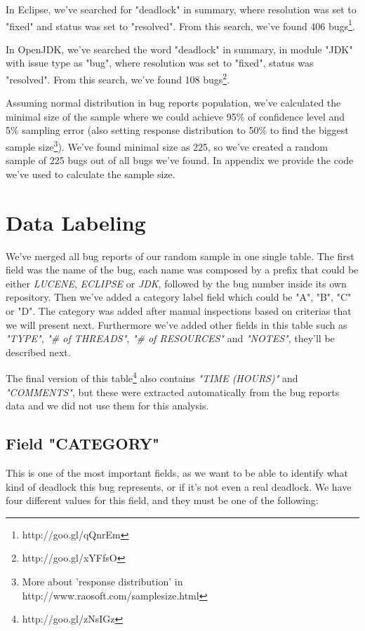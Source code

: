 In Eclipse, we've searched for "deadlock" in summary, where resolution was set to "fixed" and status was set to "resolved". From this search, we've found 406 bugs\footnote{http://goo.gl/qQnrEm}.

In OpenJDK, we've searched the word "deadlock" in summary, in module "JDK" with issue type as "bug", where resolution was set to "fixed", status was "resolved". From this search, we've found 108 bugs\footnote{http://goo.gl/xYFfsO}.

Assuming normal distribution in bug reports population, we've calculated the minimal size of the sample where we could achieve 95\% of confidence level and 5\% sampling error (also setting response distribution to 50\% to find the biggest sample size\footnote{More about 'response distribution' in http://www.raosoft.com/samplesize.html}). We've found minimal size as 225, so we've created a random sample of 225 bugs out of all bugs we've found. In appendix we provide the code we've used to calculate the sample size.

\section{Data Labeling}

We've merged all bug reports of our random sample in one single table. The first field was the name of the bug, each name was composed by a prefix that could be either \emph{LUCENE}, \emph{ECLIPSE} or \emph{JDK}, followed by the bug number inside its own repository. Then we've added a category label field which could be "A", "B", "C" or "D". The category was added after manual inspections based on criterias that we will present next. Furthermore we've added other fields in this table such as \emph{"TYPE"}, \emph{"# of THREADS"}, \emph{"# of RESOURCES"} and \emph{"NOTES"}, they'll be described next.

The final version of this table\footnote{http://goo.gl/zNsIGz} also contains \emph{"TIME (HOURS)"} and \emph{"COMMENTS"}, but these were extracted automatically from the bug reports data and we did not use them for this analysis.

\subsection{Field "CATEGORY"}

This is one of the most important fields, as we want to be able to identify what kind of deadlock this bug represents, or if it's not even a real deadlock. We have four different values for this field, and they must be one of the following:


